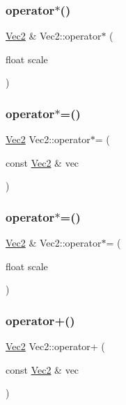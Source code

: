 \subsubsection{\texorpdfstring{operator$\ast$()}{operator*()}\hspace{0.1cm}{\footnotesize\ttfamily [2/2]}}
{\footnotesize\ttfamily \mbox{\hyperlink{struct_vec2}{Vec2}} \& Vec2\+::operator$\ast$ (\begin{DoxyParamCaption}\item[{float}]{scale }\end{DoxyParamCaption})}

\mbox{\label{struct_vec2_a1e277c51fc1cb0440e7b0247805c0f86}} 
\subsubsection{\texorpdfstring{operator$\ast$=()}{operator*=()}\hspace{0.1cm}{\footnotesize\ttfamily [1/2]}}
{\footnotesize\ttfamily \mbox{\hyperlink{struct_vec2}{Vec2}} Vec2\+::operator$\ast$= (\begin{DoxyParamCaption}\item[{const \mbox{\hyperlink{struct_vec2}{Vec2}} \&}]{vec }\end{DoxyParamCaption})}

\mbox{\label{struct_vec2_a4a32a53db5ca84b91028d4ee60630411}} 
\subsubsection{\texorpdfstring{operator$\ast$=()}{operator*=()}\hspace{0.1cm}{\footnotesize\ttfamily [2/2]}}
{\footnotesize\ttfamily \mbox{\hyperlink{struct_vec2}{Vec2}} \& Vec2\+::operator$\ast$= (\begin{DoxyParamCaption}\item[{float}]{scale }\end{DoxyParamCaption})}

\mbox{\label{struct_vec2_a65905f53c16179cea854fda5336736e2}} 
\subsubsection{\texorpdfstring{operator+()}{operator+()}}
{\footnotesize\ttfamily \mbox{\hyperlink{struct_vec2}{Vec2}} Vec2\+::operator+ (\begin{DoxyParamCaption}\item[{const \mbox{\hyperlink{struct_vec2}{Vec2}} \&}]{vec }\end{DoxyParamCaption})}

